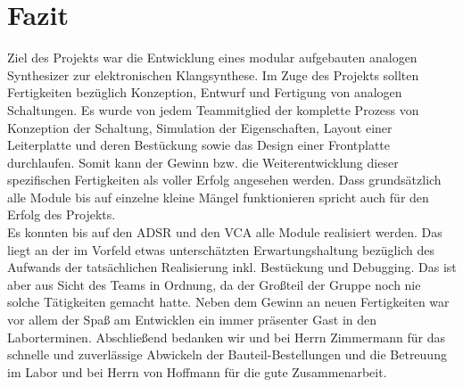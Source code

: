 \chapter{Fazit}\label{ch:fazit}
Ziel des Projekts war die Entwicklung eines modular aufgebauten analogen Synthesizer zur elektronischen Klangsynthese.
Im Zuge des Projekts sollten Fertigkeiten bezüglich Konzeption, Entwurf und Fertigung von analogen Schaltungen.
Es wurde von jedem Teammitglied der komplette Prozess von Konzeption der Schaltung, Simulation der Eigenschaften, Layout einer Leiterplatte und deren Bestückung sowie das Design einer Frontplatte durchlaufen. Somit kann der Gewinn bzw. die Weiterentwicklung dieser spezifischen Fertigkeiten als voller Erfolg angesehen werden. Dass grundsätzlich alle Module bis auf einzelne kleine Mängel funktionieren spricht auch für den Erfolg des Projekts.\\
Es konnten bis auf den ADSR und den VCA alle Module realisiert werden. Das liegt an der im Vorfeld etwas unterschätzten Erwartungshaltung bezüglich des Aufwands der tatsächlichen Realisierung inkl. Bestückung und Debugging.  
Das ist aber aus Sicht des Teams in Ordnung, da der Großteil der Gruppe noch nie solche Tätigkeiten gemacht hatte.
Neben dem Gewinn an neuen Fertigkeiten war vor allem der Spaß am Entwicklen ein immer präsenter Gast in den Laborterminen.
Abschließend bedanken wir und bei Herrn Zimmermann für das schnelle und zuverlässige Abwickeln der Bauteil-Bestellungen und die Betreuung im Labor und bei Herrn von Hoffmann für die gute Zusammenarbeit.

